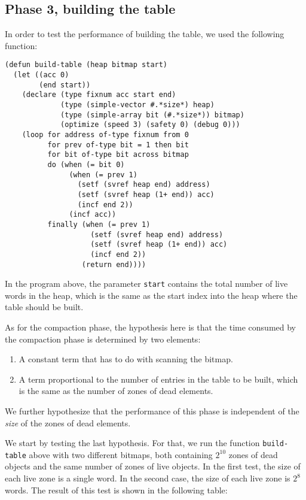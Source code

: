 \subsection{Phase 3, building the table}

In order to test the performance of building the table, we used the
following function:

{\small\begin{verbatim}
(defun build-table (heap bitmap start)
  (let ((acc 0)
        (end start))
    (declare (type fixnum acc start end)
             (type (simple-vector #.*size*) heap)
             (type (simple-array bit (#.*size*)) bitmap)
             (optimize (speed 3) (safety 0) (debug 0)))
    (loop for address of-type fixnum from 0 
          for prev of-type bit = 1 then bit
          for bit of-type bit across bitmap
          do (when (= bit 0)
               (when (= prev 1)
                 (setf (svref heap end) address)
                 (setf (svref heap (1+ end)) acc)
                 (incf end 2))
               (incf acc))
          finally (when (= prev 1)
                    (setf (svref heap end) address)
                    (setf (svref heap (1+ end)) acc)
                    (incf end 2))
                  (return end))))
\end{verbatim}}

In the program above, the parameter \texttt{start} contains the total
number of live words in the heap, which is the same as the start index
into the heap where the table should be built. 

As for the compaction phase, the hypothesis here is that the time
consumed by the compaction phase is determined by two elements:

\begin{enumerate}
\item A constant term that has to do with scanning the bitmap.
\item A term proportional to the number of entries in the table to be
  built, which is the same as the number of zones of dead elements.
\end{enumerate}

We further hypothesize that the performance of this phase is
independent of the \emph{size} of the zones of dead elements. 

We start by testing the last hypothesis.  For that, we run the
function \texttt{build-table} above with two different bitmaps, both
containing $2^{10}$ zones of dead objects and the same number of zones
of live objects.  In the first test, the size of each live zone is a
single word.  In the second case, the size of each live zone is $2^8$
words.  The result of this test is shown in the following table:

